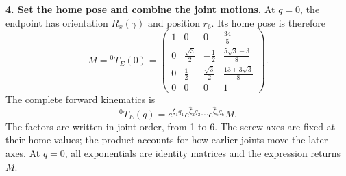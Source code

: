 \textbf{4. Set the home pose and combine the joint motions.}
At $q=0$, the endpoint has orientation $R_x(\gamma)$ and position $r_6$.
Its home pose is therefore
\begin{equation}
 M={}^0T_E(0)=
 \begin{pmatrix}
 1&0&0&\tfrac{34}{5}\\
 0&\tfrac{\sqrt3}{2}&-\tfrac12&\tfrac{5\sqrt3-3}{8}\\
 0&\tfrac12&\tfrac{\sqrt3}{2}&\tfrac{13+3\sqrt3}{8}\\
 0&0&0&1
 \end{pmatrix}.
 \label{eq:poe-home}
\end{equation}
The complete forward kinematics is
\begin{equation}
 \boxed{{}^0T_E(q)=e^{\widehat\xi_1q_1}e^{\widehat\xi_2q_2}
 \cdots e^{\widehat\xi_6q_6}M.}
 \label{eq:poe-fk}
\end{equation}
The factors are written in joint order, from 1 to 6. The screw axes are
fixed at their home values; the product accounts for how earlier joints
move the later axes. At $q=0$, all exponentials are identity matrices and
the expression returns $M$.

